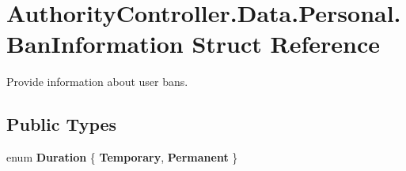 \hypertarget{struct_authority_controller_1_1_data_1_1_personal_1_1_ban_information}{}\section{Authority\+Controller.\+Data.\+Personal.\+Ban\+Information Struct Reference}
\label{struct_authority_controller_1_1_data_1_1_personal_1_1_ban_information}


Provide information about user bans.  


\subsection*{Public Types}
\begin{DoxyCompactItemize}
\item 
\mbox{\label{struct_authority_controller_1_1_data_1_1_personal_1_1_ban_information_a127a28a1db99b43e2540f18949921a7d}} 
enum {\bfseries Duration} \{ {\bfseries Temporary}, 
{\bfseries Permanent}
 \}
\end{DoxyCompactItemize}

